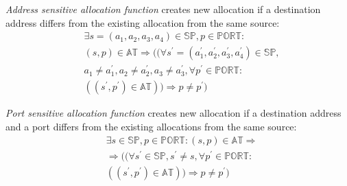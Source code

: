 \documentclass{llncs}
\begin{document}
\emph{Address sensitive allocation function} creates new allocation if a destination address differs from the existing allocation 
from the same source:
\begin{align*}
& \exists s=(a_1,a_2,a_3,a_4) \in \mathbb{SP}, p \in \mathbb{PORT}: \\
& (s, p) \in \mathbb{AT} \Rightarrow ((\forall s^{\prime}=(a_1^{\prime},a_2^{\prime},a_3^{\prime},a_4^{\prime}) \in \mathbb{SP}, \\
& a_1 \neq a_1^{\prime}, a_2 \neq a_2^{\prime}, a_3 \neq a_3^{\prime}, \forall p^{\prime} \in \mathbb{PORT}: \\
& ((s^{\prime}, p^{\prime}) \in \mathbb{AT})) \Rightarrow p \neq p^{\prime})
\end{align*}

\emph{Port sensitive allocation function} creates new allocation if a destination address and a port differs from the existing
allocations from the same source:
\begin{align*}
& \exists s \in \mathbb{SP}, p \in \mathbb{PORT}: (s, p) \in \mathbb{AT} \Rightarrow \\
& \Rightarrow ((\forall s^{\prime} \in \mathbb{SP}, s^{\prime} \neq s , \forall p^{\prime} \in \mathbb{PORT}: \\
& ((s^{\prime}, p^{\prime}) \in \mathbb{AT})) \Rightarrow p \neq p^{\prime})
\end{align*}
% 

\end{document}
